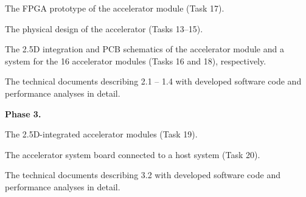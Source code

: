  The FPGA prototype of the accelerator module (Task 17).

 The physical design of the accelerator (Tasks 13--15).

 The 2.5D integration and PCB schematics of the accelerator module and a system for the 16 accelerator modules (Tasks 16 and 18), respectively.

 The technical documents describing 2.1 -- 1.4 with developed software code and performance analyses in detail.


\vspace{3pt}
\noindent
\textbf{Phase 3.}

 The 2.5D-integrated accelerator modules (Task 19).

 The accelerator system board connected to a host system (Task 20).

 The technical documents describing 3.2 with developed software code and performance analyses in detail.

